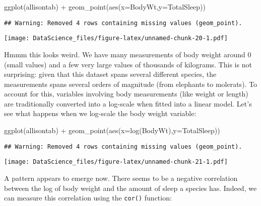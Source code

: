 \documentclass[
]{book}
\newenvironment{Shaded}{\begin{snugshade}}{\end{snugshade}}
\newcommand{\AttributeTok}[1]{\textcolor[rgb]{0.77,0.63,0.00}{#1}}
\newcommand{\FunctionTok}[1]{\textcolor[rgb]{0.00,0.00,0.00}{#1}}
\newcommand{\NormalTok}[1]{#1}
\newcommand{\SpecialCharTok}[1]{\textcolor[rgb]{0.00,0.00,0.00}{#1}}
\newcommand{\StringTok}[1]{\textcolor[rgb]{0.31,0.60,0.02}{#1}}
\begin{document}
\begin{Shaded}
\begin{Highlighting}[]
\FunctionTok{ggplot}\NormalTok{(allisontab) }\SpecialCharTok{+} \FunctionTok{geom\_point}\NormalTok{(}\FunctionTok{aes}\NormalTok{(}\AttributeTok{x=}\NormalTok{BodyWt,}\AttributeTok{y=}\NormalTok{TotalSleep))}
\end{Highlighting}
\end{Shaded}

\begin{verbatim}
## Warning: Removed 4 rows containing missing values (geom_point).
\end{verbatim}

\texttt{[image: DataScience\_files/figure-latex/unnamed-chunk-20-1.pdf]}

Hmmm this looks weird. We have many measurements of body weight around 0 (small values) and a few very large values of thousands of kilograms. This is not surprising: given that this dataset spans several different species, the measurements spans several orders of magnitude (from elephants to molerats). To account for this, variables involving body measurements (like weight or length) are traditionally converted into a log-scale when fitted into a linear model. Let's see what happens when we log-scale the body weight variable:

\begin{Shaded}
\begin{Highlighting}[]
\FunctionTok{ggplot}\NormalTok{(allisontab) }\SpecialCharTok{+} \FunctionTok{geom\_point}\NormalTok{(}\FunctionTok{aes}\NormalTok{(}\AttributeTok{x=}\FunctionTok{log}\NormalTok{(BodyWt),}\AttributeTok{y=}\NormalTok{TotalSleep))}
\end{Highlighting}
\end{Shaded}

\begin{verbatim}
## Warning: Removed 4 rows containing missing values (geom_point).
\end{verbatim}

\texttt{[image: DataScience\_files/figure-latex/unnamed-chunk-21-1.pdf]}

A pattern appears to emerge now. There seems to be a negative correlation between the log of body weight and the amount of sleep a species has. Indeed, we can measure this correlation using the \texttt{cor()} function:

\begin{Shaded}
\end{Shaded}
\end{document}
